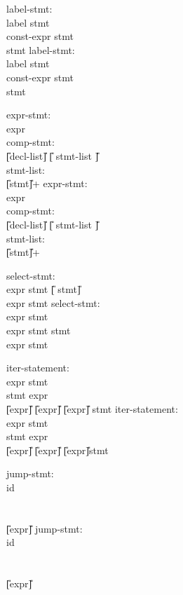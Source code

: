 \begin{center}
\PAIR
{
label-stmt:\\
\>	label \T{:} stmt\\
\>	 const-expr \T{:} stmt\\
\>	 \T{:} stmt
}
{
label-stmt:\\
\>	label \T{:} stmt\\
\>	 const-expr \T{:} stmt\\
\>	 \T{:} stmt
}


\PAIR
{
expr-stmt:\\
\>	expr \T{;}\\
comp-stmt:\\
\>	\T{\{} \U{[}decl-list\U{]} \U{[} stmt-list \U{]} \T{\}}\\
stmt-list:\\
\>	\U{[}stmt\U{]}+	
}
{
expr-stmt:\\
\>	expr \T{;}\\
comp-stmt:\\
\>	\T{\{} \U{[}decl-list\U{]} \U{[} stmt-list \U{]} \T{\}}\\
stmt-list:\\
\>	\U{[}stmt\U{]}+	
}




\PAIR 
{
select-stmt:\\
\>	 \T{(} expr \T{)} stmt \U{[} stmt\U{]}\\
\>	 \T{(} expr \T{)} stmt
}
{
select-stmt:\\
\>	 \T{(} expr \T{)} stmt\\
\>	 \T{(} expr \T{)} stmt  stmt\\
\>	 \T{(} expr \T{)} stmt
}

\PAIR
{
iter-statement:\\
\>       \T{(} expr \T{)} stmt\\
\>        stmt  \T{(} expr \T{)} \T{;}\\
\>        \T{(} \U{[}expr\U{]} \T{;} \U{[}expr\U{]} \T{;} \U{[}expr\U{]}\T{)} stmt
}
{
iter-statement:\\
\>       \T{(} expr \T{)} stmt\\
\>        stmt  \T{(} expr \T{)} \T{;}\\
\>        \T{(} \U{[}expr\U{]} \T{;} \U{[}expr\U{]} \T{;} \U{[}expr\U{]}\T{)}stmt
}

\PAIR
{
jump-stmt:\\
\>	 id \T{;}\\
\>	 \T{;}\\
\>       \T{;}\\
\>	 \U{[}expr\U{]} \T{;}
}
{
jump-stmt:\\
\>	 id \T{;}\\
\>	 \T{;}\\
\>	 \T{;}\\
\>	 \U{[}expr\U{]} \T{;}
}


\end{center}
